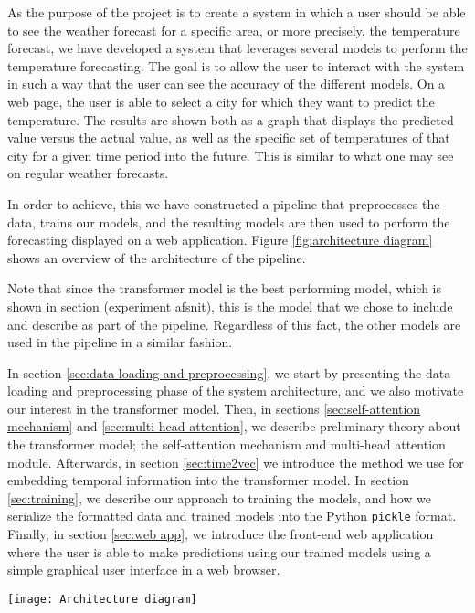 As the purpose of the project is to create a system in which a user should be able to see the weather forecast for a specific area, or more precisely, the temperature forecast, we have developed a system that leverages several models to perform the temperature forecasting. 
The goal is to allow the user to interact with the system in such a way that the user can see the accuracy of the different models. 
On a web page, the user is able to select a city for which they want to predict the temperature. The results are shown both as a graph that displays the predicted value versus the actual value, as well as the specific set of temperatures of that city for a given time period into the future. This is similar to what one may see on regular weather forecasts.

In order to achieve, this we have constructed a pipeline that preprocesses the data, trains our models, and the resulting models are then used to perform the forecasting displayed on a web application. 
Figure \ref{fig:architecture diagram} shows an overview of the architecture of the pipeline.

Note that since the transformer model is the best performing model, which is shown in section (experiment afsnit), this is the model that we chose to include and describe as part of the pipeline. Regardless of this fact, the other models are used in the pipeline in a similar fashion.

In section \ref{sec:data loading and preprocessing}, we start by presenting the data loading and preprocessing phase of the system architecture, and we also motivate our interest in the transformer model.
Then, in sections \ref{sec:self-attention mechanism} and \ref{sec:multi-head attention}, we describe preliminary theory about the transformer model; the self-attention mechanism and multi-head attention module. 
Afterwards, in section \ref{sec:time2vec} we introduce the method we use for embedding temporal information into the transformer model. 
In section \ref{sec:training}, we describe our approach to training the models, and how we serialize the formatted data and trained models into the Python \texttt{pickle} format.
Finally, in section \ref{sec:web app}, we introduce the front-end web application where the user is able to make predictions using our trained models using a simple graphical user interface in a web browser.



\begin{figure*}
	\centering
	\texttt{[image: Architecture diagram]}
	\caption{The architecture of the system pipeline.}
	\label{fig:architecture diagram}
\end{figure*}
